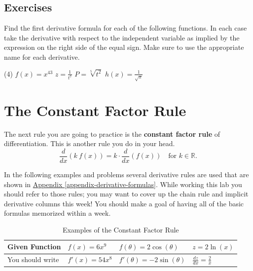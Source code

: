 \documentclass[10pt,oneside,]{book}
\newcommand{\terminology}[1]{\textbf{#1}}
\theoremstyle{plain}
\theoremstyle{definition}
\numberwithin{equation}{section}
\newcommand{\reals}{\mathbb{R}}
\newcommand{\fe}[2]{#1\mathopen{}\left(#2\right)\mathclose{}}
\newcommand{\fd}[1]{#1'}
\newcommand{\lz}[2]{\frac{d#1}{d#2}}
\newcommand{\lzoo}[2]{{\frac{d}{d#1}}{\left(#2\right)}}
\begin{document}
\subsection[Exercises]{Exercises}\label{exercises-33}
Find the first derivative formula for each of the following functions.  In each case take the derivative with respect to the independent variable as implied by the expression on the right side of the equal sign.  Make sure to use the appropriate name for each derivative.%
\par
\begin{exercisegroup}(4)
\exercise[1.]\hypertarget{exercise-353}{\null}\(\fe{f}{x}=x^{43}\)%
\exercise[2.]\hypertarget{exercise-354}{\null}\(z=\frac{1}{t^{7}}\)%
\exercise[3.]\hypertarget{exercise-355}{\null}\(P=\sqrt[5]{t^2}\)%
\exercise[4.]\hypertarget{exercise-356}{\null}\(\fe{h}{x}=\frac{1}{\sqrt{x}}\)%
\end{exercisegroup}
\par\smallskip\noindent
\typeout{************************************************}
\typeout{************************************************}
\section[The Constant Factor Rule]{The Constant Factor Rule}\label{section-constant-factor-rule}
The next rule you are going to practice is the \terminology{constant factor rule} of differentiation.  This is another rule you do in your head. \begin{equation}\lzoo{x}{k\ \fe{f}{x}}=k\cdot\lzoo{x}{\fe{f}{x}}\quad\text{for }k\in\reals\text{.}\label{men-3}\end{equation}%
\par
In the following examples and problems several derivative rules are used that are shown in \hyperref[appendix-derivative-formulas]{Appendix \ref{appendix-derivative-formulas}}.  While working this lab you should refer to those rules; you may want to cover up the chain rule and implicit derivative columns this week!  You should make a goal of having all of the basic formulas memorized within a week.%
\begin{table}
\centering
\caption{Examples of the Constant Factor Rule\label{table-constant-factor-rule}}
\begin{tabular}{l|l|l|l}
\toprule
Given Function&\(\fe{f}{x}=6x^9\)&\(\fe{f}{\theta}=2\fe{\cos}{\theta}\)&\(z=2\fe{\ln}{x}\)\\
\midrule
You should write&\(\fe{\fd{f}}{x}=54x^8\)&\(\fe{\fd{f}}{\theta}=-2\fe{\sin}{\theta}\)&\(\lz{z}{x}=\frac{2}{x}\)\\
\bottomrule
\end{tabular}
\end{table}
\typeout{************************************************}
\typeout{************************************************}
\end{document}
